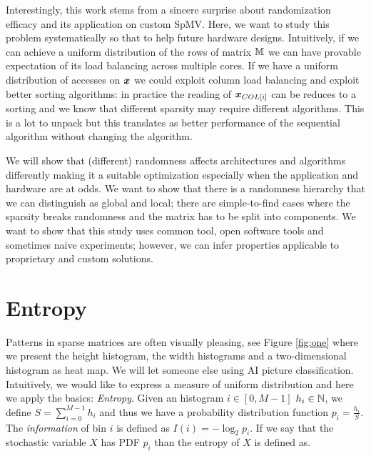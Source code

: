 \documentclass[manuscript,screen]{acmart}
\begin{document}
Interestingly, this work stems from a sincere surprise about
randomization efficacy and its application on custom SpMV. Here, we
want to study this problem systematically so that to help future
hardware designs. Intuitively, if we can achieve a uniform
distribution of the rows of matrix $\mathbb{M}$ we can have provable
expectation of its load balancing across multiple cores. If we have a
uniform distribution of accesses on ${\boldsymbol x}$ we could exploit column
load balancing and exploit better sorting algorithms: in practice the
reading of ${\boldsymbol x}_{COL[i]}$ can be reduces to a sorting and we know
that different sparsity may require different algorithms. This is a
lot to unpack but this translates as better performance of the
sequential algorithm without changing the algorithm.

We will show that (different) randomness affects architectures and
algorithms differently making it a suitable optimization especially
when the application and hardware are at odds. We want to show that
there is a randomness hierarchy that we can distinguish as global and
local; there are simple-to-find cases where the sparsity breaks
randomness and the matrix has to be split into components.  We want to
show that this study uses common tool, open software tools and
sometimes naive experiments; however, we can infer properties
applicable to proprietary and custom solutions. 


\section{Entropy}
\label{sec:entropy}
Patterns in sparse matrices are often visually pleasing, see Figure
\ref{fig:one} where we present the height histogram, the width
histograms and a two-dimensional histogram as heat map. We will let
someone else using AI picture classification. Intuitively, we would
like to express a measure of uniform distribution and here we apply
the basics: {\em Entropy}. Given an histogram $i\in[0,M-1]$ $h_i \in
\mathbb{N}$, we define $S =\sum_{i=0}^{M-1}h_i$ and thus we have a probability
distribution function $p_i = \frac{h_i}{S}$. The {\em information} of
bin $i$ is defined as $I(i) = -\log_2 p_i$. If we say that the
stochastic variable $X$ has PDF $p_i$ than the entropy of $X$ is
defined as.
\end{document}
